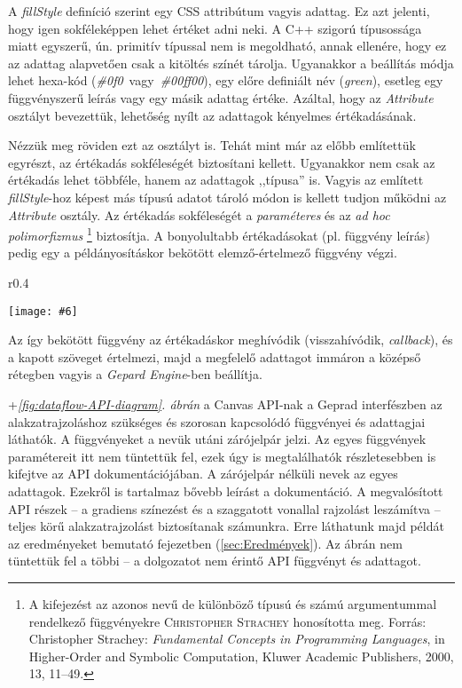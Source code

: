 \documentclass[12pt]{report}
\makeatletter
\theoremstyle{definition}
\newcommand{\inenglish}[1]{\textsl{#1}}
\newcommand{\func}[1]{{\textsl{#1}}}
\newcommand{\melyikoldalra}{r}
\newlength{\Xoffset}
\newlength{\Yoffset}
\newcommand*{\setpdfoffset}[2]{%
  \setlength{\Xoffset}{#1}%
  \setlength{\Yoffset}{#2}%
}
\newcommand*{\setviewport}[4]{%
  \def\x@viewport{%
    {\the\dimexpr#1-\Xoffset}
    {\the\dimexpr#2-\Yoffset}
    {\the\dimexpr#3-\Xoffset}
    {\the\dimexpr#4-\Yoffset}%
  }%
}
\newcommand{\includegraphicskivagas}[6]{
    \setpdfoffset{0pt}{0pt}
    \setviewport{#1}{#2}{#3}{#4}
    \texttt{[image: \#6]}
}
\newcommand{\includedataflowkivagas}[5]{
    \includegraphicskivagas{#1}{#2}{#3}{#4}{scale=0.6,#5}
    {img/built/dataflow_eps}
}
\makeatother
\begin{document}
A \func{fillStyle} definíció szerint egy CSS attribútum vagyis adattag. Ez azt
jelenti, hogy igen sokféleképpen lehet értéket adni neki. A C++ szigorú
típusossága miatt egyszerű, ún. primitív típussal nem is megoldható, annak
ellenére, hogy ez az adattag alapvetően csak a kitöltés színét tárolja.
Ugyanakkor a beállítás módja lehet hexa-kód
(\func{\#0f0}~vagy~\func{\#00ff00}), egy előre definiált név (\func{green}),
esetleg egy függvényszerű leírás vagy egy másik adattag értéke. Azáltal, hogy
az \func{Attribute} osztályt bevezettük, lehetőség nyílt az adattagok kényelmes
értékadásának.

Nézzük meg röviden ezt az osztályt is. Tehát
mint már az előbb említettük egyrészt, az értékadás sokféleségét biztosítani
kellett. Ugyanakkor nem csak az értékadás lehet többféle, hanem az adattagok
,,típusa'' is. Vagyis az említett \func{fillStyle}-hoz képest más típusú adatot
tároló módon is kellett tudjon működni az \func{Attribute} osztály. Az
értékadás sokféleségét a \emph{paraméteres} és az \emph{ad hoc polimorfizmus}
\footnote{A kifejezést az azonos nevű de különböző típusú és számú
argumentummal rendelkező függvényekre \textsc{Christopher Strachey} honosította
meg. Forrás: Christopher Strachey: \emph{Fundamental Concepts in Programming
Languages}, in Higher-Order and Symbolic Computation, Kluwer Academic
Publishers, 2000, 13, 11–49.} biztosítja. A bonyolultabb értékadásokat (pl.
függvény leírás) pedig egy a példányosításkor bekötött elemző-értelmező
függvény végzi.
  \begin{wrapfigure}{\melyikoldalra}{0.4\textwidth}
    \begin{center}
      \includedataflowkivagas{0pt}{210pt}{160pt}{590pt}{}
    \end{center} \caption{\label{fig:dataflow-API-diagram} A \emph{felső} réteg
    (Gepard interfész) függvényei és adattagjai \\ (Részlet
    \az+\emph{\ref{appendix:dataflow}. folyamatábrából}.)}
  \end{wrapfigure}
Az így bekötött függvény az értékadáskor meghívódik (visszahívódik,
\inenglish{callback}), és a kapott szöveget értelmezi, majd a megfelelő
adattagot immáron a középső rétegben vagyis a \func{Gepard Engine}-ben
beállítja.

\Az+\emph{\ref{fig:dataflow-API-diagram}. ábrán} a Canvas API-nak a Geprad
interfészben az alakzatrajzoláshoz szükséges és szorosan kapcsolódó függvényei
és adattagjai láthatók. A függvényeket a nevük utáni zárójelpár jelzi. Az egyes
függvények paramétereit itt nem tüntettük fel, ezek úgy is megtalálhatók
részletesebben is kifejtve az API dokumentációjában. A zárójelpár nélküli nevek
az egyes adattagok. Ezekről is tartalmaz bővebb leírást a dokumentáció. A
megvalósított API részek -- a gradiens színezést és a szaggatott vonallal
rajzolást leszámítva -- teljes körű alakzatrajzolást biztosítanak számunkra.
Erre láthatunk majd példát az eredményeket bemutató fejezetben
(\ref{sec:Eredmények}). Az ábrán nem tüntettük fel a többi -- a dolgozatot nem
érintő API függvényt és adattagot.
\end{document}
